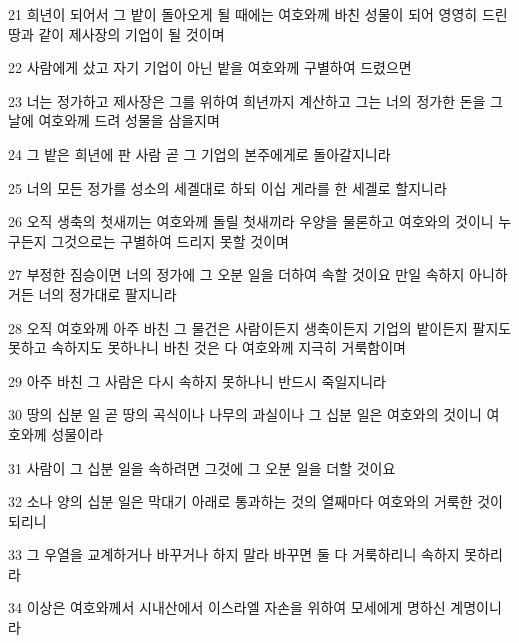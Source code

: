 \par 21 희년이 되어서 그 밭이 돌아오게 될 때에는 여호와께 바친 성물이 되어 영영히 드린 땅과 같이 제사장의 기업이 될 것이며
\par 22 사람에게 샀고 자기 기업이 아닌 밭을 여호와께 구별하여 드렸으면
\par 23 너는 정가하고 제사장은 그를 위하여 희년까지 계산하고 그는 너의 정가한 돈을 그 날에 여호와께 드려 성물을 삼을지며
\par 24 그 밭은 희년에 판 사람 곧 그 기업의 본주에게로 돌아갈지니라
\par 25 너의 모든 정가를 성소의 세겔대로 하되 이십 게라를 한 세겔로 할지니라
\par 26 오직 생축의 첫새끼는 여호와께 돌릴 첫새끼라 우양을 물론하고 여호와의 것이니 누구든지 그것으로는 구별하여 드리지 못할 것이며
\par 27 부정한 짐승이면 너의 정가에 그 오분 일을 더하여 속할 것이요 만일 속하지 아니하거든 너의 정가대로 팔지니라
\par 28 오직 여호와께 아주 바친 그 물건은 사람이든지 생축이든지 기업의 밭이든지 팔지도 못하고 속하지도 못하나니 바친 것은 다 여호와께 지극히 거룩함이며
\par 29 아주 바친 그 사람은 다시 속하지 못하나니 반드시 죽일지니라
\par 30 땅의 십분 일 곧 땅의 곡식이나 나무의 과실이나 그 십분 일은 여호와의 것이니 여호와께 성물이라
\par 31 사람이 그 십분 일을 속하려면 그것에 그 오분 일을 더할 것이요
\par 32 소나 양의 십분 일은 막대기 아래로 통과하는 것의 열째마다 여호와의 거룩한 것이 되리니
\par 33 그 우열을 교계하거나 바꾸거나 하지 말라 바꾸면 둘 다 거룩하리니 속하지 못하리라
\par 34 이상은 여호와께서 시내산에서 이스라엘 자손을 위하여 모세에게 명하신 계명이니라


